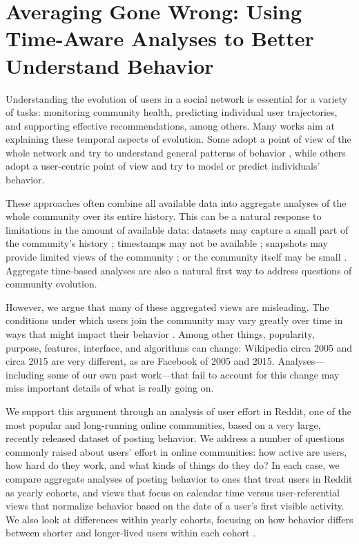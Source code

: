 \chapter{Averaging Gone Wrong: Using Time-Aware Analyses to Better Understand Behavior}
\label{ch:cohorts}

Understanding the evolution of users in a social network is essential for a variety of tasks: monitoring community health, predicting individual user trajectories, and supporting effective recommendations, among others.  Many works aim at explaining these temporal aspects of evolution. Some adopt a point of view of the whole network and try to understand general patterns of behavior \cite{Zhu2014, Kooti2010}, while others adopt a user-centric point of view and try to model \cite{Correa2010, Priedhorsky2007, Panciera2009, Welser2011} or predict \cite{Danescu-niculescu-mizil2013} individuals' behavior.

These approaches often combine all available data into aggregate analyses of the whole community over its entire history.  This can be a natural response to limitations in the amount of available data:  datasets may capture a small part of the community's history \cite{Artzi2012}; timestamps may not be available \cite{Priedhorsky2007, Pujol2010}; snapshots may provide limited views of the community \cite{Cosley2010}; or the community itself may be small \cite{Lewis2008}.  Aggregate time-based analyses are also a natural first way to address questions of community evolution.

However, we argue that many of these aggregated views are misleading. The conditions under which users join the community may vary greatly over time in ways that might impact their behavior \cite{Miller2015}.  Among other things, popularity, purpose, features, interface, and algorithms can change: Wikipedia circa 2005 and circa 2015 are very different, as are Facebook of 2005 and 2015.  Analyses---including some of our own past work---that fail to account for this change may miss important details of what is really going on.

We support this argument through an analysis of user effort in Reddit, one of the most popular and long-running online communities, based on a very large, recently released dataset of posting behavior.  We address a number of questions commonly raised about users' effort in online communities: how active are users, how hard do they work, and what kinds of things do they do?  In each case, we compare aggregate analyses of posting behavior to ones that treat users in Reddit as yearly cohorts, and views that focus on calendar time versus user-referential views that normalize behavior based on the date of a user's first visible activity.  We also look at differences within yearly cohorts, focusing on how behavior differs between shorter and longer-lived users within each cohort \cite{Barbosa2016}.

